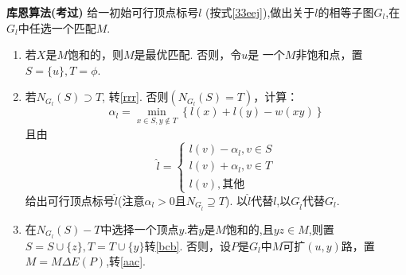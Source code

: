 \noindent \textcolor{ecolor}{\bfseries 库恩算法(考过)} \quad 给一初始可行顶点标号$l$ (按式\ref{33eej}),做出关于$l$的相等子图$G_l$,在$G_l$中任选一个匹配$M$.
\begin{enumerate}
	\item \label{aac} 若$X$是$M$饱和的，则$M$是最优匹配. 否则，令$u$是
	一个$M$非饱和点，置$S=\{u\}, T=\phi$.
	
	\item \label{bcb} 若$N_{G_l}(S)\supset T$, 转\ref{rrr}. 否则$(N_{G_l}(S)= T)$，计算：
	\[
	\alpha_l=\min\limits_{x\in S, y\notin T}\left\{l(x)+l(y)-w(xy) \right\}
	\]且由
	\[\hat{l}=
	\left\{
	\begin{array}{l}
		l(v)-\alpha_l, v\in S\\
		l(v)+\alpha_l, v \in T\\
		l(v),\mbox{其他}
	\end{array} \right.
	\]给出可行顶点标号$\hat{l}$(注意$\alpha_l>0$且$N_{G_{\hat{l}}}\supseteq T$). 以$\hat{l}$代替$l$,以$G_{\hat{l}}$代替$G_l$.
	
	
	\item \label{rrr} 在$N_{G_l}(S)-T$中选择一个顶点$y$.若$y$是$M$饱和的,且$yz\in M$,则置$S=S\cup \{z\},T=T\cup\{y\}$转\ref{bcb}. 否则，设$P$是$G_l$中$M$可扩$(u,y)$路，置$M=M\varDelta E(P)$,转\ref{aac}.
\end{enumerate}

